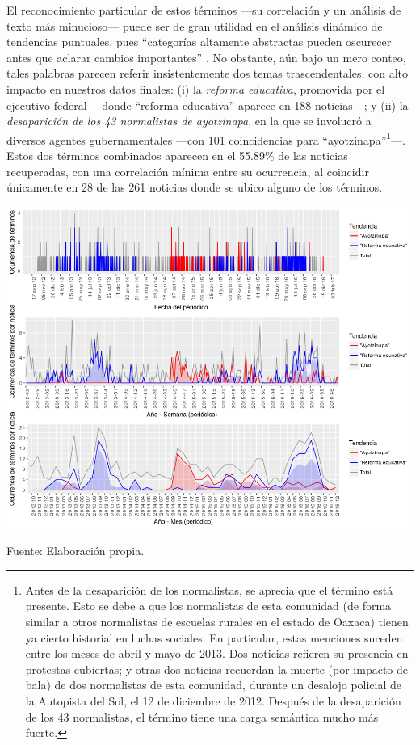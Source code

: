 \documentclass[letterpaper, 11pt]{book}
\theoremstyle{definition}
\theoremstyle{remark}
\begin{document}
El reconocimiento particular de estos términos ---su correlación y un análisis de texto más minucioso--- puede ser de gran utilidad en el análisis dinámico de tendencias puntuales,  pues ``categorías altamente abstractas pueden oscurecer antes que aclarar cambios importantes'' \citep[162]{2003_Wada_Tesis}. 
No obstante, aún bajo un mero conteo, tales palabras parecen referir insistentemente dos temas trascendentales, con alto impacto en nuestros datos finales: 
(i) la \emph{reforma educativa}, promovida por el ejecutivo federal ---donde ``reforma educativa'' aparece en 188 noticias---; 
y (ii) la \emph{desaparición de los 43 normalistas de ayotzinapa}, en la que se involucró a diversos agentes gubernamentales ---con 101 coincidencias para ``ayotzinapa''\footnote{
    Antes de la desaparición de los normalistas, se aprecia que el término está presente. 
    Esto se debe a que los normalistas de esta comunidad (de forma similar a otros normalistas de escuelas rurales en el estado de Oaxaca)  tienen ya cierto historial en luchas sociales. 
    En particular, estas menciones suceden entre los meses de abril y mayo de 2013. 
    Dos noticias refieren su presencia en protestas cubiertas; y otras dos noticias recuerdan la muerte (por impacto de bala) de dos normalistas de esta comunidad, durante un desalojo policial de la Autopista del Sol, el 12 de diciembre de 2012. 
    Después de la desaparición de los 43 normalistas, el término tiene una carga semántica mucho más fuerte.
}---. 
Estos dos términos combinados aparecen en el 55.89\% de las noticias recuperadas, con una correlación mínima entre su ocurrencia, al coincidir únicamente en 28 de las 261 noticias donde se ubico alguno de los términos. 


\hspace{-1em}\begin{minipage}{\linewidth}
\centering 
{} \label{3.3_tendenciasTerminos}
\hspace{-1.2em}\includegraphics[scale=0.62]{img/3.3_tendenciasTerminos.png}
\par
\small Fuente: Elaboración propia.
\end{minipage}\bigskip
\end{document}

